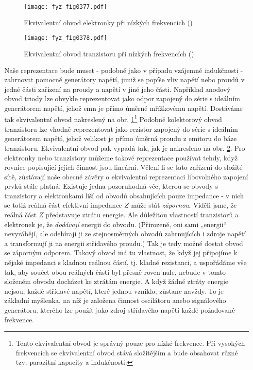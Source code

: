   \begin{figure}[ht!] %
    \centering
    \texttt{[image: fyz\_fig0377.pdf]}
    \caption{Ekvivalentní obvod elektronky při nízkých frekvencích
             (\cite[s.~415]{Feynman02})}
    \label{fyz:fig0377}
  \end{figure}

  \begin{figure}[ht!] %
    \centering
    \texttt{[image: fyz\_fig0378.pdf]}
    \caption{Ekvivalentní obvod tranzistoru při nízkých frekvencích
             (\cite[s.~415]{Feynman02})}
    \label{fyz:fig0378}
  \end{figure}
  
  Naše reprezentace bude muset - podobně jako v případu vzájemné indukčnosti - zahrnovat pomocné 
  generátory napětí, jimiž se popíše vliv napětí nebo proudů v jedné části zařízení na proudy a 
  napětí v jiné jeho části. Například anodový obvod triody lze obvykle reprezentovat jako odpor 
  zapojený do série s ideálním generátorem napětí, jehož emn je přímo úměrné mřížkovému napětí. 
  Dostáváme tak ekvivalentní obvod nakreslený na obr. \ref{fyz:fig0377}\footnote{Tento ekvivalentní 
  obvod je správný pouze pro nízké frekvence. Při vysokých frekvencích se ekvivalentní obvod stává 
  složitějším a bude obsahovat různé tzv. parazitní kapacity a indukčnosti.} Podobně kolektorový 
  obvod tranzistoru lze vhodně reprezentovat jako rezistor zapojený do série s ideálním generátorem 
  napětí, jehož velikost je přímo úměrná proudu z emitoru do báze tranzistoru. Ekvivalentní
  obvod pak vypadá tak, jak je nakresleno na obr. \ref{fyz:fig0378}. Pro elektronky nebo tranzistory 
  můžeme takové reprezentace používat tehdy, když rovnice popisující jejich činnost jsou lineární. 
  Včlení-li se tato zařízení do složité sítě, zůstávají naše obecné závěry o ekvivalentní 
  reprezentaci libovolného zapojení prvků stále platná. Existuje jedna pozoruhodná věc, kterou se 
  obvody s tranzistory a elektronkami liší od obvodů obsahujících pouze impedance - v nich se totiž 
  reálná část efektivní impedance \(Z\) může stát \emph{zápornou}. Viděli jsme, že reálná část 
  \(Z\) představuje ztrátu energie. Ale důležitou vlastností tranzistorů a elektronek je, že 
  \emph{dodávají} energii do obvodu. (Přirozeně, oni sami „energii“ nevyrábějí, ale odebírají ji ze 
  stejnosměrných obvodů zahrnujících i zdroje napětí a transformují ji na energii střídavého 
  proudu.) Tak je tedy možné dostat obvod se záporným odporem. Takový obvod má tu vlastnost, že 
  když jej připojíme k nějaké impedanci s kladnou reálnou částí, tj. kladné rezistanci, a 
  uspořádáme vše tak, aby součet obou reálných částí byl přesně roven nule, nebude v tomto složeném 
  obvodu docházet ke ztrátám energie. A když žádné ztráty energie nejsou, každé střídavé napětí, 
  které jednou vzniklo, zůstane navždy. To je základní myšlenka, na níž je založena činnost 
  oscilátoru anebo signálového generátoru, kterého lze použít jako zdroj střídavého napětí každé 
  požadované frekvence.
  
